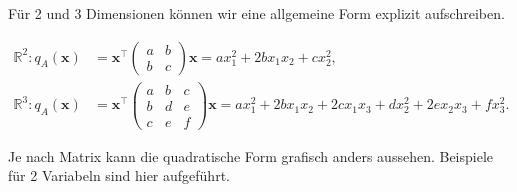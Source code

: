Für 2 und 3 Dimensionen können wir eine allgemeine Form explizit aufschreiben. 

\begin{equation*}
    \begin{aligned}
        \mathbb{R}^2: q_A(\mathbf{x}) &= \mathbf{x}^\top \begin{pmatrix} a & b \\ b & c \end{pmatrix} \mathbf{x} = ax_1^2 + 2bx_1x_2 + cx_2^2, \\[1em]
        \mathbb{R}^3: q_A(\mathbf{x}) &= \mathbf{x}^\top \begin{pmatrix} a & b & c \\ b & d & e \\ c & e & f \end{pmatrix} \mathbf{x} = ax_1^2 + 2bx_1x_2 + 2cx_1x_3 + dx_2^2 + 2ex_2x_3 + fx_3^2.
    \end{aligned}
\end{equation*}

\vspace{0.25\baselineskip}

Je nach Matrix kann die quadratische Form grafisch anders aussehen. Beispiele für 2 Variabeln sind hier aufgeführt.

